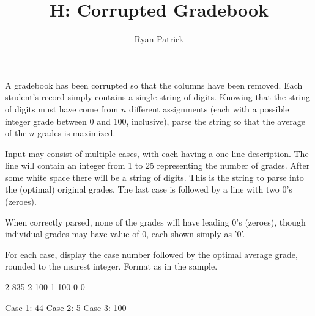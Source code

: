 \documentclass{article}
\title{H: Corrupted Gradebook}
\author{Ryan Patrick}
\begin{document}
\begin{problemDescription}
A gradebook has been corrupted so that the columns have been removed. Each 
student's record simply contains a single string of digits. Knowing that the 
string of digits must have come from $n$ different assignments (each with a 
possible integer grade between 0 and 100, inclusive), parse the string so that 
the average of the $n$ grades is maximized. 
\end{problemDescription}

\begin{inputDescription}
Input may consist of multiple cases, with each having a one line description. 
The line will contain an integer from 1 to 25 representing the number of
grades.  After some white space there will be a string of digits.  This is the 
string to parse into the (optimal) original grades.  The last case is followed 
by a line with two 0's (zeroes).

When correctly parsed, none of the grades will have leading 0's (zeroes), though
individual grades may have value of 0, each shown simply as '0'.
\end{inputDescription}

\begin{outputDescription}
For each case, display the case number followed by the optimal average grade,
rounded to the nearest integer.  Format as in the sample.
\end{outputDescription}

\begin{sampleInput}
2  835
2  100
1  100
0  0
\end{sampleInput}
\begin{sampleOutput}
Case 1: 44
Case 2: 5
Case 3: 100
\end{sampleOutput}
\end{document}
